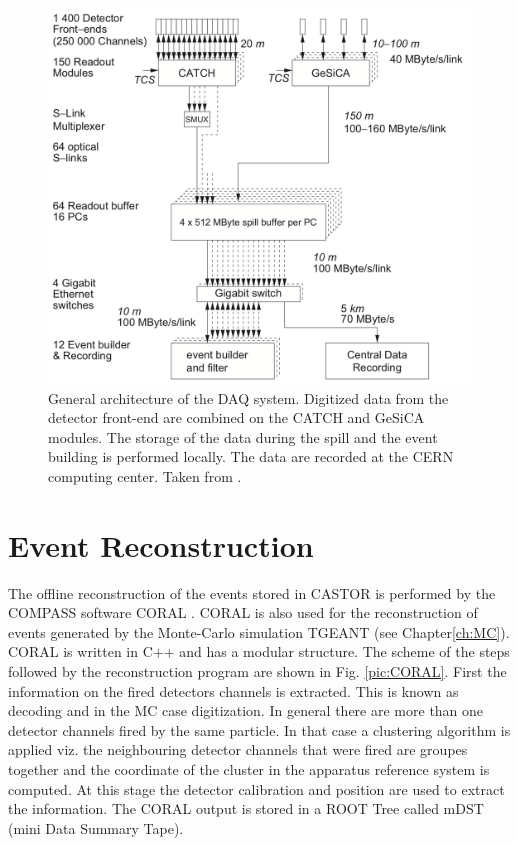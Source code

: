 \begin{figure}[!h]
  \centering
	\includegraphics[scale=0.4]{./gfx/DAQ.png}
	\caption{General architecture of the DAQ system. Digitized data from the detector front-end are combined on the CATCH and GeSiCA modules. The storage of the data during the spill and the event building is performed locally. The data are recorded at the CERN computing center. Taken from \cite{NIM}.}
	\label{pic:DAQ}
\end{figure}


\section{Event Reconstruction}

The offline reconstruction of the events stored in CASTOR is performed by the COMPASS software CORAL \cite{}. CORAL is also used for the reconstruction of events generated by the Monte-Carlo
simulation TGEANT (see Chapter\ref{ch:MC}). CORAL is written in C++ and has a modular structure. The scheme of the steps followed by the reconstruction program are shown in Fig. \ref{pic:CORAL}. First the
information on the fired detectors channels is extracted. This is known as decoding and in the MC case digitization. In general there are more than one detector channels fired by the same
particle. In that case a clustering algorithm is applied viz. the neighbouring detector channels that were fired are groupes together and the coordinate of the cluster in the apparatus reference
system is computed. At this stage the detector calibration and position are used to extract the information. The CORAL output is stored in a ROOT Tree called mDST (mini Data Summary Tape).

